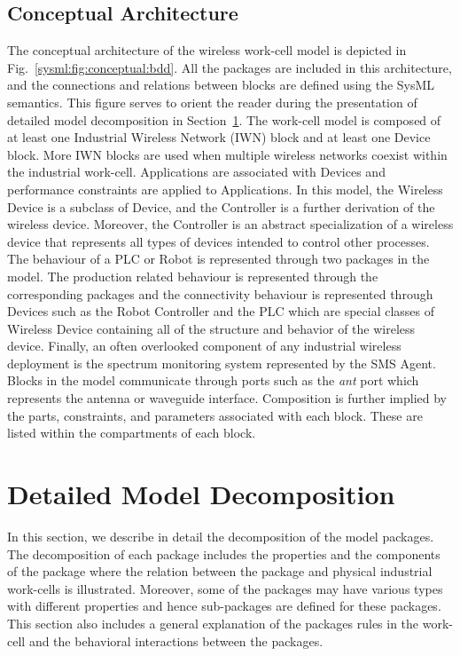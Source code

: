 \subsection{Conceptual Architecture}\label{sysml:sec:architecture}
The conceptual architecture of the wireless work-cell model is depicted in Fig.~\ref{sysml:fig:conceptual:bdd}. All the packages are included in this architecture, and the connections and relations between blocks are defined using the SysML semantics. This figure serves to orient the reader during the presentation of detailed model decomposition in Section~\ref{sysml:sec:detailed-model}. The work-cell model is composed of at least one Industrial Wireless Network (IWN) block and at least one Device block. More IWN blocks are used when multiple wireless networks coexist within the industrial work-cell. Applications are associated with Devices and performance constraints are applied to Applications. In this model, the Wireless Device is a subclass of Device, and the Controller is a further derivation of the wireless device. Moreover, the Controller is an abstract specialization of a wireless device that represents all types of devices intended to control other processes. The behaviour of a PLC or Robot is represented through two packages in the model. The production related behaviour is represented through the corresponding packages and the connectivity behaviour is represented through Devices such as the Robot Controller and the PLC which are special classes of Wireless Device containing all of the structure and behavior of the wireless device. Finally, an often overlooked component of any industrial wireless deployment is the spectrum monitoring system represented by the SMS Agent. Blocks in the model communicate through ports such as the \textit{ant} port which represents the antenna or waveguide interface.  Composition is further implied by the parts, constraints, and parameters associated with each block. These are listed within the compartments of each block.

\section{Detailed Model Decomposition}\label{sysml:sec:detailed-model}
In this section, we describe in detail the decomposition of the model packages. The decomposition of each package includes the properties and the components of the package where the relation between the package and physical industrial work-cells is illustrated. Moreover, some of the packages may have various types with different properties and hence sub-packages are defined for these packages. This section also includes a general explanation of the packages rules in the work-cell and the behavioral interactions between the packages.      

